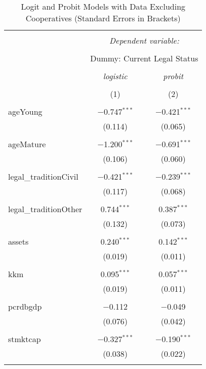 \documentclass[a4paper,nobind]{templates/ociamthesis}
\begin{document}
\begin{table}[!htbp] \centering 
  \caption{Logit and Probit Models with Data Excluding Cooperatives (Standard Errors in Brackets)} 
  \label{} 
\footnotesize 
\begin{tabular}{@{\extracolsep{5pt}}lcc} 
\\[-1.8ex]\hline 
\hline \\[-1.8ex] 
 & \multicolumn{2}{c}{\textit{Dependent variable:}} \\ 
\cline{2-3} 
\\[-1.8ex] & \multicolumn{2}{c}{Dummy: Current Legal Status} \\ 
\\[-1.8ex] & \textit{logistic} & \textit{probit} \\ 
\\[-1.8ex] & (1) & (2)\\ 
\hline \\[-1.8ex] 
 ageYoung & $-$0.747$^{***}$ & $-$0.421$^{***}$ \\ 
  & (0.114) & (0.065) \\ 
  & & \\ 
 ageMature & $-$1.200$^{***}$ & $-$0.691$^{***}$ \\ 
  & (0.106) & (0.060) \\ 
  & & \\ 
 legal\_traditionCivil & $-$0.421$^{***}$ & $-$0.239$^{***}$ \\ 
  & (0.117) & (0.068) \\ 
  & & \\ 
 legal\_traditionOther & 0.744$^{***}$ & 0.387$^{***}$ \\ 
  & (0.132) & (0.073) \\ 
  & & \\ 
 assets & 0.240$^{***}$ & 0.142$^{***}$ \\ 
  & (0.019) & (0.011) \\ 
  & & \\ 
 kkm & 0.095$^{***}$ & 0.057$^{***}$ \\ 
  & (0.019) & (0.011) \\ 
  & & \\ 
 pcrdbgdp & $-$0.112 & $-$0.049 \\ 
  & (0.076) & (0.042) \\ 
  & & \\ 
 stmktcap & $-$0.327$^{***}$ & $-$0.190$^{***}$ \\ 
  & (0.038) & (0.022) \\ 
  & & \\ 

\end{tabular}
\end{table}
\end{document}
